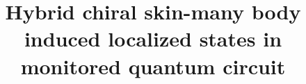 \documentclass[longbibliography, aps, prx, amsmath, amssymb, amsfonts, twocolumn,superscriptaddress, footinbib]{revtex4-1}
\begin{document}
	
	
	\title{Hybrid chiral skin-many body induced localized states in monitored quantum circuit}

	


\end{document}
